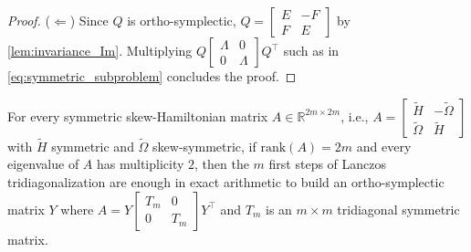 \documentclass[10pt,twoside,dvipsnames]{siamart1116}
\numberwithin{algorithm}{section}
\numberwithin{equation}{section}
\begin{document}
\begin{proof}
	($\Longleftarrow$) Since $Q$ is ortho-symplectic, $Q=\left[\begin{smallmatrix}E&-F\\
	F&E\end{smallmatrix}\right]$ by \cref{lem:invariance_Im}. Multiplying $Q\left[\begin{smallmatrix}
	\Lambda&0\\
	0&\Lambda
	\end{smallmatrix}\right]Q^\top $ such as in \eqref{eq:symmetric_subproblem} concludes the proof.
	\end{proof}
\begin{theorem}\label{thm:symplectic_tridiag}
For every symmetric skew-Hamiltonian matrix $A\in\mathbb{R}^{2m\times 2m}$, i.e., $A=\left[\begin{smallmatrix}
	\widetilde{H}&-\widetilde{\Omega}\\
	\widetilde{\Omega}&\widetilde{H}
	\end{smallmatrix}\right]$ with $\widetilde{H}$ symmetric and $\widetilde{\Omega}$ skew-symmetric, if $\mathrm{rank}(A)=2m$ and every eigenvalue of $A$ has multiplicity $2$, then the $m$ first steps of Lanczos tridiagonalization are enough in exact arithmetic to build an ortho-symplectic matrix $Y$ where $A = Y\left[\begin{smallmatrix}
	T_m&0\\
	0&T_m
	\end{smallmatrix}\right]Y^\top $ and $T_m$ is an $m\times m$ tridiagonal symmetric matrix.
	\end{theorem}
\end{document}
